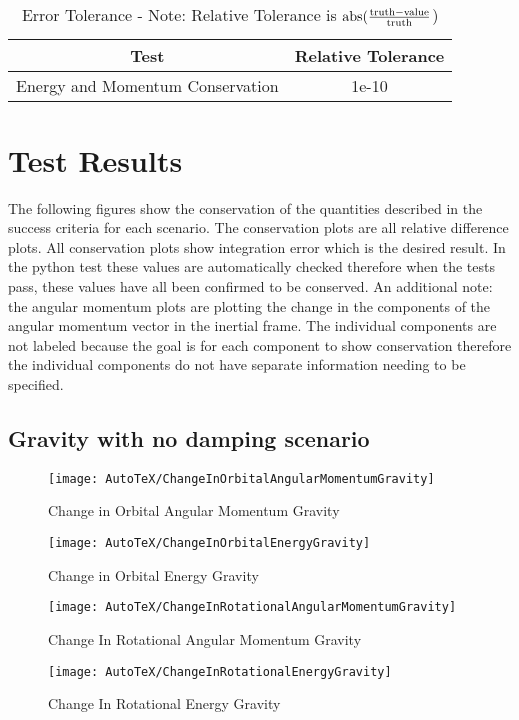 \begin{table}[htbp]
	\caption{Error Tolerance - Note: Relative Tolerance is $\textnormal{abs}(\frac{\textnormal{truth} - \textnormal{value}}{\textnormal{truth}}$)}
	\label{tab:errortol}
	\centering \fontsize{10}{10}\selectfont
	\begin{tabular}{| c | c |} %
		\hline
		Test   & Relative Tolerance \\
		\hline
		Energy and Momentum Conservation & 1e-10 \\
		\hline	
	\end{tabular}
\end{table}

\clearpage

\section{Test Results}

The following figures show the conservation of the quantities described in the success criteria for each scenario. The conservation plots are all relative difference plots. All conservation plots show integration error which is the desired result. In the python test these values are automatically checked therefore when the tests pass, these values have all been confirmed to be conserved. An additional note: the angular momentum plots are plotting the change in the components of the angular momentum vector in the inertial frame. The individual components are not labeled because the goal is for each component to show conservation therefore the individual components do not have separate information needing to be specified.  

\subsection{Gravity with no damping scenario}
\begin{figure}[htbp]
	\centerline{
		\texttt{[image: AutoTeX/ChangeInOrbitalAngularMomentumGravity]}}
	\caption{Change in Orbital Angular Momentum Gravity}
	\label{fig:ChangeInOrbitalAngularMomentumGravity}
\end{figure}
\begin{figure}[htbp]
	\centerline{
		\texttt{[image: AutoTeX/ChangeInOrbitalEnergyGravity]}}
	\caption{Change in Orbital Energy Gravity}
	\label{fig:ChangeInOrbitalEnergyGravity}
\end{figure}
\begin{figure}[htbp]
	\centerline{
		\texttt{[image: AutoTeX/ChangeInRotationalAngularMomentumGravity]}}
	\caption{Change In Rotational Angular Momentum Gravity}
	\label{fig:ChangeInRotationalAngularMomentumGravity}
\end{figure}
\begin{figure}[htbp]
	\centerline{
		\texttt{[image: AutoTeX/ChangeInRotationalEnergyGravity]}}
	\caption{Change In Rotational Energy Gravity}
	\label{fig:ChangeInRotationalEnergyGravity}
\end{figure}
\clearpage

